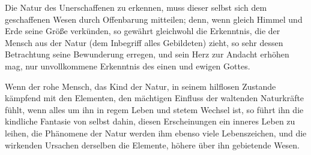 \documentclass[a4paper, 11pt, oneside, polutonikogreek, german]{article}
\begin{document}
Die Natur des Unerschaffenen zu erkennen, muss dieser selbst sich dem geschaffenen Wesen durch Offenbarung mitteilen; denn, wenn gleich Himmel und Erde seine Größe verkünden, so gewährt gleichwohl die Erkenntnis, die der Mensch aus der Natur (dem Inbegriff alles Gebildeten) zieht, so sehr dessen Betrachtung seine Bewunderung erregen, und sein Herz zur Andacht erhöhen mag, nur unvollkommene Erkenntnis des einen und ewigen Gottes.

Wenn der rohe Mensch, das Kind der Natur, in seinem hilflosen Zustande kämpfend mit den Elementen, den mächtigen Einfluss der waltenden Naturkräfte fühlt, wenn alles um ihn in regem Leben und stetem Wechsel ist, so führt ihn die kindliche Fantasie von selbst dahin, diesen Erscheinungen ein inneres Leben zu leihen, die Phänomene der Natur werden ihm ebenso viele Lebenszeichen, und die wirkenden Ursachen derselben die Elemente, höhere über ihn gebietende Wesen.
\end{document}
